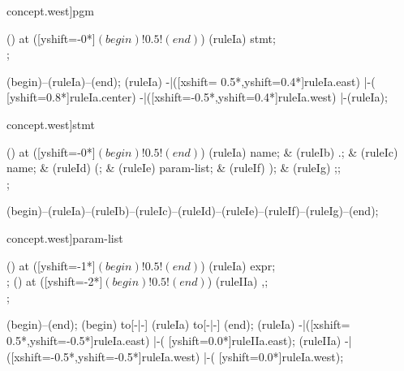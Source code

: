 \begin{syntax}[[xshift=24mm]concept.west]{pgm}
  
  \node[sequence] () at ([yshift=-0*\syntaxruledist]$(begin)!0.5!(end)$) {
    \node[nonterminal]    (ruleIa) {stmt};
    \\
  };
  
  \draw[path] (begin)--(ruleIa)--(end);
  \draw[path] (ruleIa)
            -|([xshift= 0.5*\syntaxruledist,yshift=0.4*\syntaxruledist]ruleIa.east)
            |-(                            [yshift=0.8*\syntaxruledist]ruleIa.center)
            -|([xshift=-0.5*\syntaxruledist,yshift=0.4*\syntaxruledist]ruleIa.west)
            |-(ruleIa);
\end{syntax}
\begin{syntax}[[xshift=24mm]concept.west]{stmt}
  
  \node[sequence] () at ([yshift=-0*\syntaxruledist]$(begin)!0.5!(end)$) {
    \node[nonterminal] (ruleIa) {name};
    &
    \node[terminal]    (ruleIb) {.};
    &
    \node[nonterminal] (ruleIc) {name};
    &
    \node[terminal]    (ruleId) {(};
    &
    \node[nonterminal] (ruleIe) {param-list};
    &
    \node[terminal]    (ruleIf) {)};
    &
    \node[terminal]    (ruleIg) {;};
    \\
  };
  
  \draw[path] (begin)--(ruleIa)--(ruleIb)--(ruleIc)--(ruleId)--(ruleIe)--(ruleIf)--(ruleIg)--(end);
\end{syntax}
\begin{syntax}[[xshift=24mm]concept.west]{param-list}
  
  \node[sequence] () at ([yshift=-1*\syntaxruledist]$(begin)!0.5!(end)$) {
    \node[nonterminal] (ruleIa) {expr};
    \\
  };
  \node[sequence] () at ([yshift=-2*\syntaxruledist]$(begin)!0.5!(end)$) {
    \node[terminal] (ruleIIa) {,};
    \\
  };
  
  \draw[path] (begin)--(end);
  \draw[path] (begin) to[-|-] (ruleIa) to[-|-] (end);
  \draw[path] (ruleIa)
            -|([xshift= 0.5*\syntaxruledist,yshift=-0.5*\syntaxruledist]ruleIa.east)
            |-(                            [yshift=0.0*\syntaxruledist]ruleIIa.east);
  \draw[path] (ruleIIa)
            -|([xshift=-0.5*\syntaxruledist,yshift=-0.5*\syntaxruledist]ruleIa.west)
            |-(                            [yshift=0.0*\syntaxruledist]ruleIa.west);
\end{syntax}
